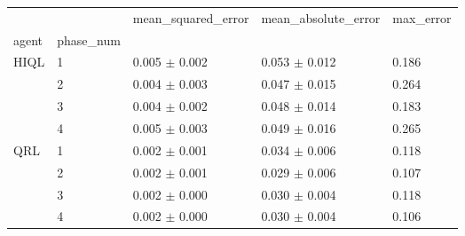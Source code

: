\begin{tabular}{lllll}
\toprule
 &  & mean_squared_error & mean_absolute_error & max_error \\
agent & phase_num &  &  &  \\
\midrule
\multirow[t]{4}{*}{HIQL} & 1 & 0.005 $\pm$ 0.002 & 0.053 $\pm$ 0.012 & 0.186 \\
 & 2 & 0.004 $\pm$ 0.003 & 0.047 $\pm$ 0.015 & 0.264 \\
 & 3 & 0.004 $\pm$ 0.002 & 0.048 $\pm$ 0.014 & 0.183 \\
 & 4 & 0.005 $\pm$ 0.003 & 0.049 $\pm$ 0.016 & 0.265 \\
\cline{1-5}
\multirow[t]{4}{*}{QRL} & 1 & 0.002 $\pm$ 0.001 & 0.034 $\pm$ 0.006 & 0.118 \\
 & 2 & 0.002 $\pm$ 0.001 & 0.029 $\pm$ 0.006 & 0.107 \\
 & 3 & 0.002 $\pm$ 0.000 & 0.030 $\pm$ 0.004 & 0.118 \\
 & 4 & 0.002 $\pm$ 0.000 & 0.030 $\pm$ 0.004 & 0.106 \\
\cline{1-5}
\bottomrule
\end{tabular}
